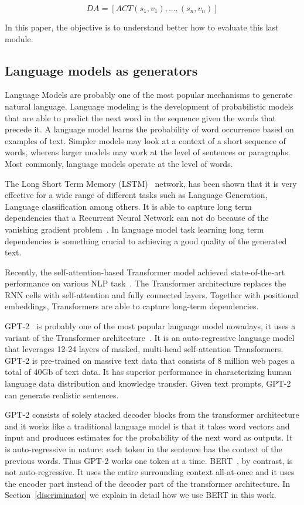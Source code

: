 \documentclass[11pt]{article}
\begin{document}
$$ DA = [ACT{(s_{1},v_{1}), ... ,(s_{n},v_{n})}] $$

In this paper, the objective is to understand better how to evaluate this last module.


\subsection{Language models as generators} \label{language_model}
Language Models are probably one of the most popular mechanisms to generate natural language. Language modeling is the development of probabilistic models that are able to predict the next word in the sequence given the words that precede it.
A language model learns the probability of word occurrence based on examples of text. Simpler models may look at a context of a short sequence of words, whereas larger models may work at the level of sentences or paragraphs. Most commonly, language models operate at the level of words.

The Long Short Term Memory (LSTM)~\cite{hochreiter1997long} network, has been shown that it is very effective for a wide range of different tasks such as Language Generation, Language classification among others. It is able to capture long term dependencies that a Recurrent Neural Network can not do because of the vanishing gradient problem~\cite{bengio1994learning}. In language model task learning long term dependencies is something crucial to achieving a good quality of the generated text.

Recently, the self-attention-based Transformer model achieved state-of-the-art performance on various NLP task~\cite{vaswani2017attention}. The Transformer architecture replaces the RNN cells with self-attention and fully connected layers. Together with positional embeddings, Transformers are able to capture long-term dependencies.

GPT-2~\cite{radford2019language} is probably one of the most popular language model nowadays, it uses a variant of the Transformer  architecture~\cite{vaswani2017attention}. It is an auto-regressive language model that leverages 12-24 layers of masked, multi-head self-attention Transformers. GPT-2 is pre-trained on massive text data that consists of 8 million web pages a total of 40Gb of text data. It has superior performance in characterizing human language data distribution and knowledge transfer. Given text prompts, GPT-2 can generate realistic sentences.


GPT-2 consists of solely stacked decoder blocks from the transformer architecture and it works like a traditional language model is that it takes word vectors and input and produces estimates for the probability of the next word as outputs. It is auto-regressive in nature: each token in the sentence has the context of the previous words. Thus GPT-2 works one token at a time. BERT~\cite{devlin2018bert}, by contrast, is not auto-regressive. It uses the entire surrounding context all-at-once and it uses the encoder part instead of the decoder part of the transformer architecture. In Section~\ref{discriminator} we explain in detail how we use BERT in this work.
\end{document}
